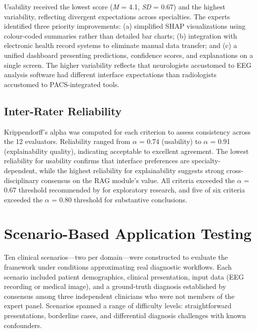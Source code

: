 Usability received the lowest score (\textit{M} = 4.1, \textit{SD} = 0.67) and the highest variability, reflecting divergent expectations across specialties. The experts identified three priority improvements: (a) simplified SHAP visualizations using colour-coded summaries rather than detailed bar charts; (b) integration with electronic health record systems to eliminate manual data transfer; and (c) a unified dashboard presenting predictions, confidence scores, and explanations on a single screen. The higher variability reflects that neurologists accustomed to EEG analysis software had different interface expectations than radiologists accustomed to PACS-integrated tools.

\subsection{Inter-Rater Reliability}

Krippendorff's alpha was computed for each criterion to assess consistency across the 12 evaluators. Reliability ranged from $\alpha$ = 0.74 (usability) to $\alpha$ = 0.91 (explainability quality), indicating acceptable to excellent agreement. The lowest reliability for usability confirms that interface preferences are specialty-dependent, while the highest reliability for explainability suggests strong cross-disciplinary consensus on the RAG module's value. All criteria exceeded the $\alpha$ = 0.67 threshold recommended by \citet{krippendorff2011computing} for exploratory research, and five of six criteria exceeded the $\alpha$ = 0.80 threshold for substantive conclusions.


\section{Scenario-Based Application Testing}
\label{sec:scenario_testing}

Ten clinical scenarios---two per domain---were constructed to evaluate the framework under conditions approximating real diagnostic workflows. Each scenario included patient demographics, clinical presentation, input data (EEG recording or medical image), and a ground-truth diagnosis established by consensus among three independent clinicians who were not members of the expert panel. Scenarios spanned a range of difficulty levels: straightforward presentations, borderline cases, and differential diagnosis challenges with known confounders.

